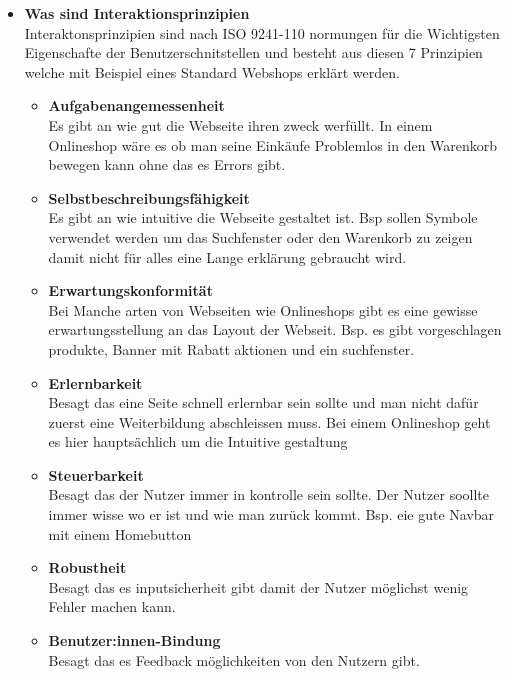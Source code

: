\documentclass[10pt]{article}
\begin{document}
\begin{itemize}
		\item \textbf{Was sind Interaktionsprinzipien}
		\\ Interaktonsprinzipien sind nach ISO 9241-110 normungen für die Wichtigsten Eigenschafte der Benutzerschnitstellen und besteht aus diesen 7 Prinzipien welche mit Beispiel eines Standard Webshops erklärt werden.
		\begin{itemize}
			\item \textbf{Aufgabenangemessenheit}
			\\ Es gibt an wie gut die Webseite ihren zweck werfüllt. In einem Onlineshop wäre es ob man seine Einkäufe Problemlos in den Warenkorb bewegen kann ohne das es Errors gibt.
			\item \textbf{Selbstbeschreibungsfähigkeit}
			\\ Es gibt an wie intuitive die Webseite gestaltet ist. Bsp sollen Symbole verwendet werden um das Suchfenster oder den Warenkorb zu zeigen damit nicht für alles eine Lange erklärung gebraucht wird.
			\item \textbf{Erwartungskonformität}
			\\ Bei Manche arten von Webseiten wie Onlineshops gibt es eine gewisse erwartungsstellung an das Layout der Webseit. Bsp. es gibt vorgeschlagen produkte, Banner mit Rabatt aktionen und ein suchfenster.
			\item \textbf{Erlernbarkeit}
			\\ Besagt das eine Seite schnell erlernbar sein sollte und man nicht dafür zuerst eine Weiterbildung abschleissen muss. Bei einem Onlineshop geht es hier hauptsächlich um die Intuitive gestaltung
			\item \textbf{Steuerbarkeit}
			\\ Besagt das der Nutzer immer in kontrolle sein sollte. Der Nutzer soollte immer wisse wo er ist und wie man zurück kommt. Bsp. eie gute Navbar mit einem Homebutton
			\item \textbf{Robustheit}
			\\ Besagt das es inputsicherheit gibt damit der Nutzer möglichst wenig Fehler machen kann.
			\item \textbf{Benutzer:innen-Bindung}
			\\ Besagt das es Feedback möglichkeiten von den Nutzern gibt.
		\end{itemize}
	\end{itemize}
\end{document}
